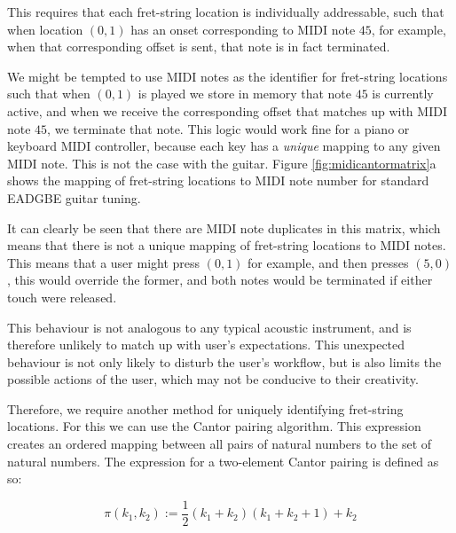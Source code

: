 This requires that each fret-string location is individually addressable, such that when location $(0, 1)$ has an onset corresponding to MIDI note $45$, for example, when that corresponding offset is sent, that note is in fact terminated.

We might be tempted to use MIDI notes as the identifier for fret-string locations such that when $(0, 1)$ is played we store in memory that note $45$ is currently active, and when we receive the corresponding offset that matches up with MIDI note $45$, we terminate that note. This logic would work fine for a piano or keyboard MIDI controller, because each key has a \textit{unique} mapping to any given MIDI note. This is not the case with the guitar. Figure \ref{fig:midicantormatrix}a shows the mapping of fret-string locations to MIDI note number for standard EADGBE guitar tuning.



It can clearly be seen that there are MIDI note duplicates in this matrix, which means that there is not a unique mapping of fret-string locations to MIDI notes. This means that a user might press $(0, 1)$ for example, and then presses $(5, 0)$, this would override the former, and both notes would be terminated if either touch were released. 

This behaviour is not analogous to any typical acoustic instrument, and is therefore unlikely to match up with user's expectations. This unexpected behaviour is not only likely to disturb the user's workflow, but is also limits the possible actions of the user, which may not be conducive to their creativity.


Therefore, we require another method for uniquely identifying fret-string locations. For this we can use the Cantor pairing algorithm. This expression creates an ordered mapping between all pairs of natural numbers to the set of natural numbers. The expression for a two-element Cantor pairing is defined as so:

\begin{equation} \label{eq:cantor}
    \pi(k_1, k_2) := \frac{1}{2}(k_1 + k_2)(k_1 + k_2 + 1) + k_2
\end{equation}





